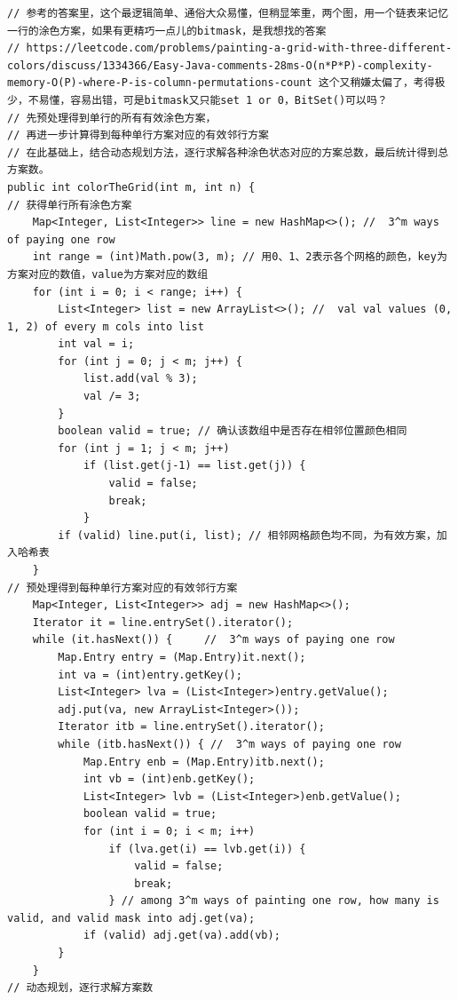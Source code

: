 \documentclass[9pt, b5paaper]{book}
\begin{document}
\begin{verbatim}
// 参考的答案里，这个最逻辑简单、通俗大众易懂，但稍显笨重，两个图，用一个链表来记忆一行的涂色方案，如果有更精巧一点儿的bitmask，是我想找的答案
// https://leetcode.com/problems/painting-a-grid-with-three-different-colors/discuss/1334366/Easy-Java-comments-28ms-O(n*P*P)-complexity-memory-O(P)-where-P-is-column-permutations-count 这个又稍嫌太偏了，考得极少，不易懂，容易出错，可是bitmask又只能set 1 or 0，BitSet()可以吗？
// 先预处理得到单行的所有有效涂色方案，
// 再进一步计算得到每种单行方案对应的有效邻行方案
// 在此基础上，结合动态规划方法，逐行求解各种涂色状态对应的方案总数，最后统计得到总方案数。
public int colorTheGrid(int m, int n) {
// 获得单行所有涂色方案
    Map<Integer, List<Integer>> line = new HashMap<>(); //  3^m ways of paying one row
    int range = (int)Math.pow(3, m); // 用0、1、2表示各个网格的颜色，key为方案对应的数值，value为方案对应的数组
    for (int i = 0; i < range; i++) {
        List<Integer> list = new ArrayList<>(); //  val val values (0, 1, 2) of every m cols into list
        int val = i;
        for (int j = 0; j < m; j++) {
            list.add(val % 3);
            val /= 3;
        }
        boolean valid = true; // 确认该数组中是否存在相邻位置颜色相同
        for (int j = 1; j < m; j++) 
            if (list.get(j-1) == list.get(j)) {
                valid = false;
                break;
            }
        if (valid) line.put(i, list); // 相邻网格颜色均不同，为有效方案，加入哈希表
    }
// 预处理得到每种单行方案对应的有效邻行方案
    Map<Integer, List<Integer>> adj = new HashMap<>();
    Iterator it = line.entrySet().iterator();
    while (it.hasNext()) {     //  3^m ways of paying one row
        Map.Entry entry = (Map.Entry)it.next();
        int va = (int)entry.getKey();
        List<Integer> lva = (List<Integer>)entry.getValue();
        adj.put(va, new ArrayList<Integer>());
        Iterator itb = line.entrySet().iterator();
        while (itb.hasNext()) { //  3^m ways of paying one row
            Map.Entry enb = (Map.Entry)itb.next(); 
            int vb = (int)enb.getKey();
            List<Integer> lvb = (List<Integer>)enb.getValue();
            boolean valid = true;
            for (int i = 0; i < m; i++) 
                if (lva.get(i) == lvb.get(i)) {
                    valid = false;
                    break;
                } // among 3^m ways of painting one row, how many is valid, and valid mask into adj.get(va);
            if (valid) adj.get(va).add(vb); 
        }
    }
// 动态规划，逐行求解方案数

\end{verbatim}
\end{document}

